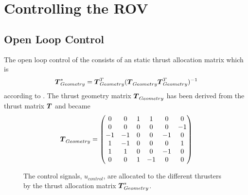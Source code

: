 \chapter{Controlling the ROV} \label{cha:controller}

\section{Open Loop Control}
The open loop control of the \abbrROV consists of an static thrust allocation matrix which is
\begin{equation}
    \thrusterGeometryOnes[*] = \thrusterGeometryOnes[T](\thrusterGeometryOnes \thrusterGeometryOnes[T])^{-1}
\end{equation}
according to \citet{thrustallocation}. The thrust geometry matrix $\thrusterGeometryOnes$ has been derived from the thrust matrix $\thrusterGeometry$ and became 
\begin{equation*}
    \thrusterGeometryOnes = 
    \begin{pmatrix}
    0  & 0  & 1 & 1  &  0 &  0 \\
    0  & 0  & 0 & 0  &  0 & -1 \\
    -1 & -1 & 0 & 0  & -1 &  0 \\
    1  & -1 & 0 & 0  &  0 &  1 \\
    1  & 1  & 0 & 0  & -1 &  0 \\
    0  & 0  & 1 & -1 &  0 &  0 \\
    \end{pmatrix}
\end{equation*}


\begin{figure}
    \centering

    \caption{The control signals, $u_{control}$, are allocated to the different thrusters by the thrust allocation matrix $\thrusterGeometryOnes[*]$.} 
    \label{fig:open_control}
\end{figure}

